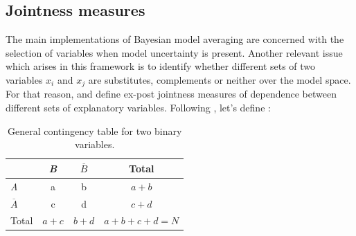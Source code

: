 \subsection{Jointness measures}\label{sec:jointness_measures}
The main implementations of Bayesian model averaging are concerned
with the selection of variables when model uncertainty is
present. Another relevant issue which arises in this framework is to
identify whether different sets of two variables $x_i$ and $x_j$ are
substitutes, complements or neither over the model space. For that
reason, \cite{LeySteel2007} and \cite{DoppelhoferWeeks2009} define
ex-post jointness measures of dependence between different sets of
explanatory variables. Following \cite{BivariateJointness-2018},
let's define :

\begin{table}[htb]
	\centering
	\caption{General contingency table for two binary variables.}
	\begin{tabular}{l|ccc}\hline
						&\textit{B}	&	$\overline{B}$	&Total	\\\hline
		\textit{A}		&	a		&	b			& $a+b$		\\
		$\overline{A}$	&	c		&	d			& $c+d$		\\
		Total			&	$a+c$	&	$b+d$		& $a+b+c+d=N$\\\hline
	\end{tabular}
	\label{tab:GeneralContingencyTable}
\end{table}

